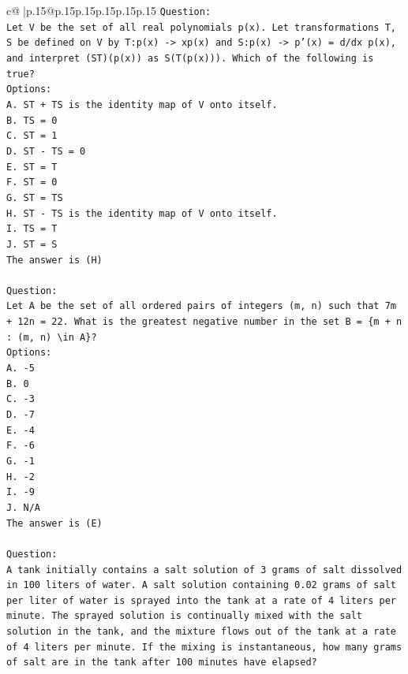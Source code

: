 \documentclass{article}
\begin{document}
{\begin{supertabular}{c@{$\;$}|p{.15\linewidth}@{}p{.15\linewidth}p{.15\linewidth}p{.15\linewidth}p{.15\linewidth}p{.15\linewidth}}
{{{\texttt{Question:} \\
\texttt{Let V be the set of all real polynomials p(x). Let transformations T, S be defined on V by T:p(x) {-}> xp(x) and S:p(x) {-}> p'(x) = d/dx p(x), and interpret (ST)(p(x)) as S(T(p(x))). Which of the following is true?} \\
\texttt{Options:} \\
\texttt{A. ST + TS is the identity map of V onto itself.} \\
\texttt{B. TS = 0} \\
\texttt{C. ST = 1} \\
\texttt{D. ST {-} TS = 0} \\
\texttt{E. ST = T} \\
\texttt{F. ST = 0} \\
\texttt{G. ST = TS} \\
\texttt{H. ST {-} TS is the identity map of V onto itself.} \\
\texttt{I. TS = T} \\
\texttt{J. ST = S} \\
\texttt{The answer is (H)} \\
\\ 
\texttt{Question:} \\
\texttt{Let A be the set of all ordered pairs of integers (m, n) such that 7m + 12n = 22. What is the greatest negative number in the set B = \{m + n : (m, n) \textbackslash{}in A\}?} \\
\texttt{Options:} \\
\texttt{A. {-}5} \\
\texttt{B. 0} \\
\texttt{C. {-}3} \\
\texttt{D. {-}7} \\
\texttt{E. {-}4} \\
\texttt{F. {-}6} \\
\texttt{G. {-}1} \\
\texttt{H. {-}2} \\
\texttt{I. {-}9} \\
\texttt{J. N/A} \\
\texttt{The answer is (E)} \\
\\ 
\texttt{Question:} \\
\texttt{A tank initially contains a salt solution of 3 grams of salt dissolved in 100 liters of water. A salt solution containing 0.02 grams of salt per liter of water is sprayed into the tank at a rate of 4 liters per minute. The sprayed solution is continually mixed with the salt solution in the tank, and the mixture flows out of the tank at a rate of 4 liters per minute. If the mixing is instantaneous, how many grams of salt are in the tank after 100 minutes have elapsed?} \\
}}}
\end{supertabular}}
\end{document}
